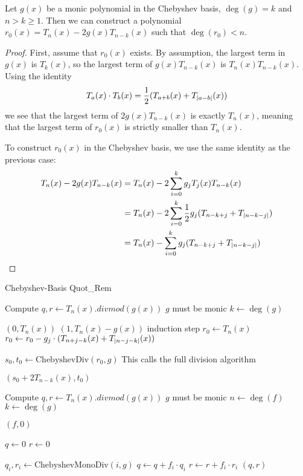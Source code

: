 \documentclass[../fheimpl.tex]{subfiles}
\begin{document}
	\begin{lemma}
		\label{lem:r0lemma}
		Let $g(x)$ be a monic polynomial in the Chebyshev basis, $\deg(g)=k$ and $n>k\ge 1$. Then we can construct a polynomial $r_0(x) = T_n(x) - 2g(x)T_{n-k}(x)$ such that $\deg(r_0) < n$.
	\end{lemma}
	\begin{proof}
		First, assume that $r_0(x)$ exists. By assumption, the largest term in $g(x)$ is $T_k(x)$, so the largest term of $g(x)T_{n-k}(x)$ is $T_n(x)T_{n-k}(x)$. Using the identity\[T_a(x)\cdot T_b(x) = \frac{1}{2}(T_{a+b}(x)+T_{\lvert a-b\rvert}(x))\]
		we see that the largest term of $2g(x)T_{n-k}(x)$ is exactly $T_n(x)$, meaning that the largest term of $r_0(x)$ is strictly smaller than $T_n(x)$.
		
		To construct $r_0(x)$ in the Chebyshev basis, we use the same identity as the previous case:
		\begin{align}
			T_n(x)-2g(x)T_{n-k}(x) & = T_n(x)-2\sum_{i=0}^kg_jT_j(x)T_{n-k}(x) \\
			& = T_n(x)-2\sum_{i=0}^k\frac{1}{2}g_j(T_{n-k+j} + T_{\lvert n-k-j\rvert}) \\
			& = T_n(x)-\sum_{i=0}^kg_j(T_{n-k+j} + T_{\lvert n-k-j\rvert})
		\end{align}
	\end{proof}
	
	\begin{algorithm}
		\caption{Chebyshev-Basis Quot\_Rem}\label{alg:chebydiv}
		\begin{algorithmic}[1]
			\Comment Compute $q, r\gets T_n(x).divmod(g(x))$
			\State \Comment $g$ must be monic
			\State $k \gets \deg(g)$
			
			 
			\State \Return $(0, T_n(x))$
			 
			\State \Return $(1, T_n(x)-g(x))$
			\Else
			\Comment induction step
			\State $r_0 \gets T_n(x)$
			\State $r_0 \gets r_0 - g_j\cdot (T_{n+j-k}(x) + T_{\lvert n-j-k\rvert}(x))$
			\EndFor
			
			\State $s_0, t_0 \gets \text{ChebyshevDiv}(r_0, g)$
			\Comment This calls the full division algorithm
			
			\State \Return $(s_0 + 2T_{n-k}(x), t_0)$
			\EndIf
			\EndProcedure
			\State
			
			
			\Comment Compute $q, r\gets T_n(x).divmod(g(x))$
			\State \Comment $g$ must be monic
			\State $n \gets \deg(f)$
			\State $k \gets \deg(g)$
			
			 
			\State \Return $(f, 0)$
			\EndIf
			
			\State $q\gets 0$
			\State $r\gets 0$
			
			\State $q_i, r_i\gets \text{ChebyshevMonoDiv}(i, g)$
			\State $q \gets q + f_i\cdot q_i$
			\State $r \gets r + f_i\cdot r_i$
			\EndFor
			\State \Return $(q,r)$
			\EndProcedure
		\end{algorithmic}
	\end{algorithm}
	
\end{document}
